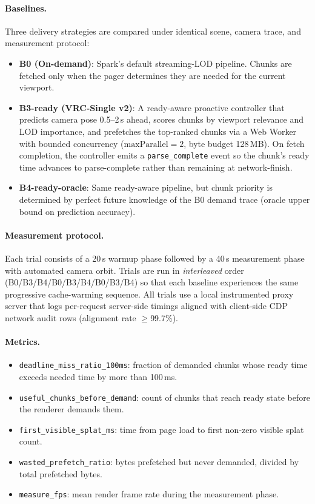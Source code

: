 \paragraph{Baselines.}
Three delivery strategies are compared under identical scene, camera trace,
and measurement protocol:
\begin{itemize}
  \item \textbf{B0 (On-demand)}: Spark's default streaming-LOD pipeline.
    Chunks are fetched only when the pager determines they are needed for the
    current viewport.
  \item \textbf{B3-ready (VRC-Single v2)}: A ready-aware proactive controller
    that predicts camera pose 0.5--2\,s ahead, scores chunks by viewport
    relevance and LOD importance, and prefetches the top-ranked chunks via a
    Web Worker with bounded concurrency ($\text{maxParallel}=2$, byte budget
    128\,MB). On fetch completion, the controller emits a
    \texttt{parse\_complete} event so the chunk's ready time advances to
    parse-complete rather than remaining at network-finish.
  \item \textbf{B4-ready-oracle}: Same ready-aware pipeline, but chunk
    priority is determined by perfect future knowledge of the B0 demand trace
    (oracle upper bound on prediction accuracy).
\end{itemize}

\paragraph{Measurement protocol.}
Each trial consists of a 20\,s warmup phase followed by a 40\,s measurement
phase with automated camera orbit. Trials are run in \emph{interleaved} order
(B0/B3/B4/B0/B3/B4/B0/B3/B4) so that each baseline experiences the same
progressive cache-warming sequence. All trials use a local instrumented proxy
server that logs per-request server-side timings aligned with client-side CDP
network audit rows (alignment rate $\geq$99.7\%).

\paragraph{Metrics.}
\begin{itemize}
  \item \texttt{deadline\_miss\_ratio\_100ms}: fraction of demanded chunks
    whose ready time exceeds needed time by more than 100\,ms.
  \item \texttt{useful\_chunks\_before\_demand}: count of chunks that reach
    ready state before the renderer demands them.
  \item \texttt{first\_visible\_splat\_ms}: time from page load to first
    non-zero visible splat count.
  \item \texttt{wasted\_prefetch\_ratio}: bytes prefetched but never demanded,
    divided by total prefetched bytes.
  \item \texttt{measure\_fps}: mean render frame rate during the measurement
    phase.
\end{itemize}

